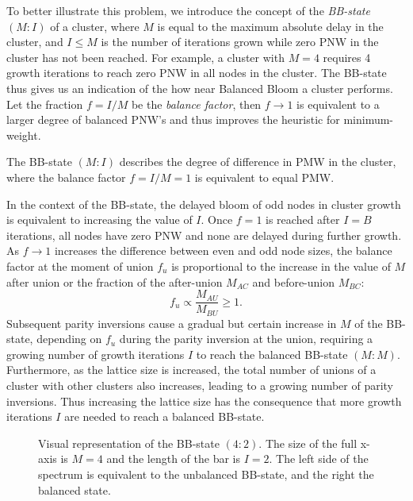 To better illustrate this problem, we introduce the concept of the \emph{BB-state} $(M:I)$ of a cluster, where $M$ is equal to the maximum absolute delay in the cluster, and $I\leq M$ is the number of iterations grown while zero PNW in the cluster has not been reached. For example, a cluster with $M=4$ requires 4 growth iterations to reach zero PNW in all nodes in the cluster. The BB-state thus gives us an indication of the how near Balanced Bloom a cluster performs. Let the fraction $f=I/M$ be the \emph{balance factor}, then $f \to 1$ is equivalent to a larger degree of balanced PNW's and thus improves the heuristic for minimum-weight.
\begin{lemma}\label{lem:bbstate}
  The BB-state $(M:I)$ describes the degree of difference in PMW in the cluster, where the balance factor $f=I/M=1$ is equivalent to equal PMW.
\end{lemma}
In the context of the BB-state, the delayed bloom of odd nodes in cluster growth is equivalent to increasing the value of $I$. Once $f=1$ is reached after $I=B$ iterations, all nodes have zero PNW and none are delayed during further growth. As $f\to1$ increases the difference between even and odd node sizes, the balance factor at the moment of union $f_u$ is proportional to the increase in the value of $M$ after union or the fraction of the after-union $M_{AC}$ and before-union $M_{BC}$:
\begin{equation}\label{eq:bbpropto}
  f_u \propto \frac{M_{AU}}{M_{BU}} \geq 1.
\end{equation}
Subsequent parity inversions cause a gradual but certain increase in $M$ of the BB-state, depending on $f_u$ during the parity inversion at the union, requiring a growing number of growth iterations $I$ to reach the balanced BB-state $(M:M)$. Furthermore, as the lattice size is increased, the total number of unions of a cluster with other clusters also increases, leading to a growing number of parity inversions. Thus increasing the lattice size has the consequence that more growth iterations $I$ are needed to reach a balanced BB-state.
\begin{figure}
  \centering
  \caption{Visual representation of the BB-state $(4:2)$. The size of the full x-axis is $M=4$ and the length of the bar is $I=2$. The left side of the spectrum is equivalent to the unbalanced BB-state, and the right the balanced state.}\label{fig:bbstate}
\end{figure}

